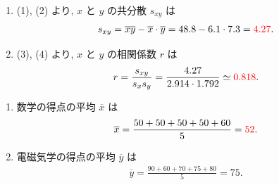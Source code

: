 \begin{qenumerate}
{\begin{enumerate}
{				表, (1) より, 標準偏差 $s_{x}$, $s_{y}$ は
				\begin{align}
					s_{x} &= \sqrt{\frac{1}{10}\sum_{i = 1}^{10}{\left(x_{i} - \overline{x}\right)^{2}}}
						 = \sqrt{\frac{1}{10}\sum_{i = 1}^{10}{\left(x_{i}^{2} -2\overline{x}x_{i} + \overline{x}^{2}\right)}} \\
						&= \sqrt{\frac{1}{10}\cdot\left(\sum_{i = 1}^{10}{x_{i}^{2}} - 2\overline{x}\sum_{i = 1}^{10}{x_{i}} + 10\overline{x}^{2}\right)} \\
						&= \sqrt{\frac{1}{10}\cdot\left(457 - 2\cdot 6.1\cdot 61 + 10\cdot 6.1^{2}\right)} \\
						&\simeq \red{2.914}, \\
					s_{y} &= \sqrt{\frac{1}{10}\sum_{i = 1}^{10}{\left(y_{i} - \overline{y}\right)^{2}}}
						 = \sqrt{\frac{1}{10}\sum_{i = 1}^{10}{\left(y_{i}^{2} -2\overline{y}y_{i} + \overline{y}^{2}\right)}} \\
						&= \sqrt{\frac{1}{10}\cdot\left(\sum_{i = 1}^{10}{y_{i}^{2}} - 2\overline{y}\sum_{i = 1}^{10}{y_{i}} + 10\overline{y}^{2}\right)} \\
						&= \sqrt{\frac{1}{10}\cdot\left(565 - 2\cdot 7.3\cdot 73 + 10\cdot 7.3^{2}\right)} \\
						&\simeq \red{1.792}.
				\end{align}
			}
			\item{
				(1), (2) より, $x$ と $y$ の共分散 $s_{xy}$ は
				\begin{align}
					s_{xy} = \overline{xy} - \overline{x}\cdot\overline{y} = 48.8 - 6.1\cdot 7.3 = \textcolor{red}{4.27}.
				\end{align}
			}
			\item{
				(3), (4) より, $x$ と $y$ の相関係数 $r$ は
				\begin{align}
					r = \frac{s_{xy}}{s_{x}s_{y}} = \frac{4.27}{2.914\cdot1.792} \simeq \textcolor{red}{0.818}.
				\end{align}
			}
		\end{enumerate}
	}
	\item{
		\begin{enumerate}
			\item{
				数学の得点の平均 $\overline{x}$ は
				\begin{align}
					\overline{x} = \frac{50 + 50 + 50 + 50 + 60}{5} = \textcolor{red}{52}.
				\end{align}
			}
			\item{
				電磁気学の得点の平均 $\overline{y}$ は
				\begin{align}
					\overline{y} = \frac{90 + 60 + 70 + 75 + 80}{5} = 75.

\end{align}}
\end{enumerate}}
\end{qenumerate}
